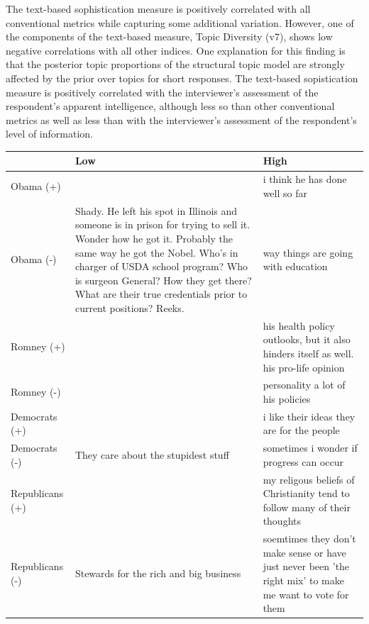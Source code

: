 \documentclass[a0,landscape]{a0poster}
\begin{document}
\begin{multicols}{4}
The text-based sophistication measure is positively correlated with all conventional metrics while capturing some additional variation. However, one of the components of the text-based measure, Topic Diversity (v7), shows low negative correlations with all other indices. One explanation for this finding is that the posterior topic proportions of the structural topic model are strongly affected by the prior over topics for short responses. The text-based sopistication measure is positively correlated with the interviewer's assessment of the respondent's apparent intelligence, although less so than other conventional metrics as well as less than with the interviewer's assessment of the respondent's level of information.

\begin{center}\footnotesize
\begin{tabular}[ht]{lp{10.5cm}p{10.5cm}}
   \toprule
  & Low & High \\ 
   \midrule
   Obama (+) &  & i think he has done well so far \\ 
   Obama (-) & Shady. He left his spot in Illinois and someone is in prison for trying to sell it. Wonder how he got it. Probably the same way he got the Nobel. Who's in charger of USDA school program? Who is surgeon General? How they get there? What are their true credentials prior to current positions? Reeks. & way things are going with education \\ 
   Romney (+) &  & his health policy outlooks, but it also hinders itself as well. his pro-life opinion \\ 
   Romney (-) &  & personality a lot of his policies \\ 
   Democrats (+) &  & i like their ideas they are for the people \\ 
   Democrats (-) & They care about the stupidest stuff & sometimes i wonder if progress can occur \\ 
   Republicans (+) &  & my religous beliefs of Christianity tend to follow many of their thoughts \\ 
   Republicans (-) & Stewards for the rich and big business & soemtimes they don't make sense or have just never been 'the right mix' to make me want to vote for them \\ 
    \bottomrule
    \end{tabular}
  \end{center}



\end{multicols}
\end{document}
